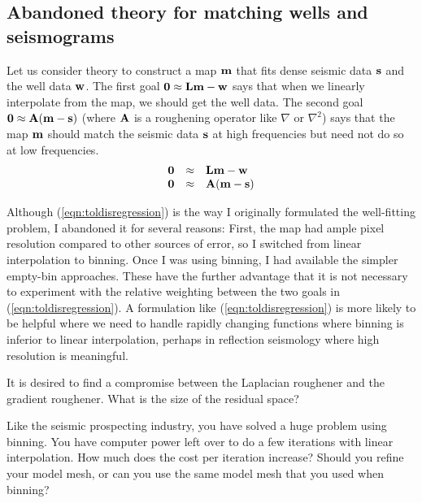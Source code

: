 \subsection{Abandoned theory for matching wells and seismograms}
\par
Let us consider theory to
construct a map $\bold m$ that fits dense seismic data
$\bold s$ and the well data $\bold w$.
The first goal
$\bold 0 \approx  \bold L \bold m - \bold w$
says that when we linearly interpolate from the map,
we should get the well data.
The second goal
$\bold 0 \approx \bold A (\bold m - \bold s)$
(where $\bold A$ is a roughening operator like $\nabla$ or $\nabla^2$)
says that the map $\bold m$ should match the seismic data $\bold s$
at high frequencies but need not do so at low frequencies.
\begin{equation}
        \begin{array}{lll}
        \bold 0 &\approx & \bold L \bold m - \bold w \\
        \bold 0 &\approx & \bold A (\bold m - \bold s)
        \label{eqn:toldisregression}
        \end{array}
\end{equation}
\par
Although (\ref{eqn:toldisregression}) is the way I originally formulated
the well-fitting problem, I abandoned it for several reasons:
First, the map had ample pixel resolution compared to other sources of error,
so I switched from linear interpolation to binning.
Once I was using binning,
I had available the simpler empty-bin approaches.
These have the further advantage that it is not necessary
to experiment with the relative weighting between
the two goals in (\ref{eqn:toldisregression}).
A formulation like (\ref{eqn:toldisregression}) is more likely
to be helpful where we need to handle rapidly changing functions
where binning is inferior to linear interpolation,
perhaps in reflection seismology where high resolution is meaningful.
\begin{exer}
\item
        It is desired to find a compromise between
        the Laplacian roughener
        and the gradient roughener.
        What is the size of the residual space?
\item
        Like the seismic prospecting industry,
        you have solved a huge problem using binning.
        You have computer power left over
        to do a few iterations with linear interpolation.
        How much does the cost per iteration increase?
        Should you refine your model mesh,
        or can you use the same model mesh
        that you used when binning?
\end{exer}


